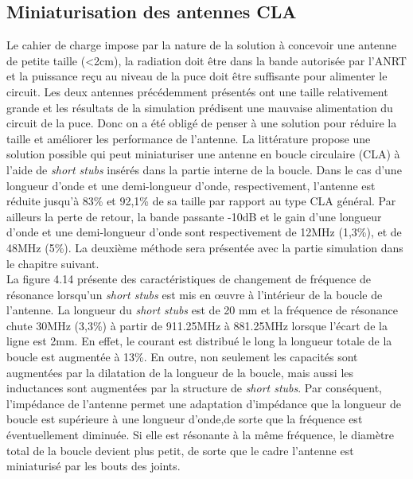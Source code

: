\documentclass[11pt, a4paper, twoside]{book}
\begin{document}
\subsection{Miniaturisation des antennes CLA}
Le cahier de charge impose par la nature de la solution à concevoir une antenne de petite taille (<2cm), la radiation doit être dans la bande autorisée par l'ANRT et la puissance reçu au niveau de la puce doit être suffisante pour alimenter le circuit. Les deux antennes précédemment présentés ont une taille relativement grande et les résultats de la simulation prédisent une mauvaise alimentation du circuit de la puce. Donc on a été obligé de penser à une solution pour réduire la taille et améliorer les performance de l'antenne. La littérature \cite{stub}  propose une solution possible qui peut
miniaturiser une antenne en boucle circulaire (CLA) à l'aide de \emph{short stubs} insérés dans la partie interne de la boucle. Dans le cas d'une longueur d'onde et une demi-longueur d'onde, respectivement, l'antenne est réduite jusqu'à 83\% et 92,1\% de sa taille par rapport au type CLA général. Par ailleurs la perte de retour, la bande passante -10dB et le gain d'une longueur d'onde et une demi-longueur d'onde sont respectivement de 12MHz (1,3\%), et de 48MHz (5\%). La deuxième méthode sera présentée avec la partie simulation dans le chapitre suivant.\\

La figure 4.14 présente des caractéristiques de changement de fréquence de résonance lorsqu'un \emph{short stubs} est mis en œuvre à l'intérieur de la boucle de l'antenne. La longueur du  \emph{short stubs} est de 20 mm et la fréquence de résonance chute 30MHz (3,3\%) à partir de 911.25MHz à 881.25MHz lorsque l'écart de la ligne est 2mm. En effet, le courant est distribué le long la longueur totale de la boucle est augmentée à 13\%. En outre, non seulement les capacités sont augmentées par la dilatation de la longueur de la boucle, mais aussi les inductances sont augmentées par la structure de \emph{short stubs}. Par conséquent, l'impédance de l'antenne permet une adaptation d'impédance que la longueur de boucle est supérieure à une longueur d'onde,de sorte que la fréquence est éventuellement diminuée. Si elle est résonante à la même fréquence, le diamètre total de la boucle devient plus petit, de sorte que le cadre l'antenne est miniaturisé par les bouts des joints.
\end{document}
